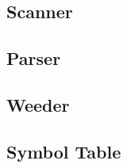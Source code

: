 \documentclass{article}
\begin{document}
\subsection{Scanner}


\subsection{Parser}

\subsection{Weeder}


\subsection{Symbol Table}
\end{document}
